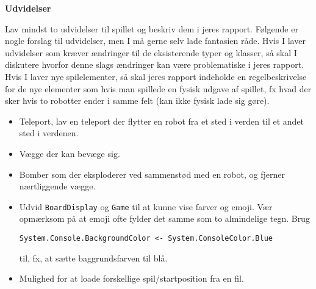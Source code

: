 \textbf{Udvidelser}

Lav mindst to udvidelser til spillet og beskriv dem i jeres
rapport. Følgende er nogle forslag til udvidelser, men I må gerne selv
lade fantasien råde. Hvis I laver udvidelser som kræver ændringer til
de eksisterende typer og klasser, så skal I diskutere hvorfor denne
slags ændringer kan være problematiske i jeres rapport. Hvis I laver
nye spilelementer, så skal jeres rapport indeholde en regelbeskrivelse
for de nye elementer som hvis man spillede en fysisk udgave af
spillet, fx hvad der sker hvis to robotter ender i samme felt (kan
ikke fysisk lade sig gøre).

\begin{itemize}
\item Teleport, lav en teleport der flytter en robot fra et sted i
  verden til et andet sted i verdenen.
\item Vægge der kan bevæge sig.
\item Bomber som der eksploderer ved sammenstød med en robot, og
  fjerner nærtliggende vægge.
\item Udvid \lstinline{BoardDisplay} og \lstinline{Game} til at kunne
  vise farver og emoji. Vær opmærksom på at emoji ofte fylder det
  samme som to almindelige tegn. Brug
\begin{lstlisting}
System.Console.BackgroundColor <- System.ConsoleColor.Blue
\end{lstlisting}
  til, fx, at sætte baggrundsfarven til blå.
\item Mulighed for at loade forskellige spil/startposition fra en fil.
\end{itemize}


